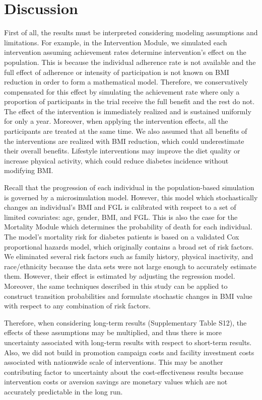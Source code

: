 \documentclass[fleqn,10pt]{wlscirep}
\begin{document}
\section*{Discussion}
First of all, the results must be interpreted considering modeling assumptions and limitations. For example, in the Intervention Module, we simulated each intervention assuming achievement rates determine intervention's effect on the population. This is because the individual adherence rate is not available and the full effect of adherence or intensity of participation is not known on BMI reduction in order to form a mathematical model. Therefore, we conservatively compensated for this effect by simulating the achievement rate where only a proportion of participants in the trial receive the full benefit and the rest do not. The effect of the intervention is immediately realized and is sustained uniformly for only a year. Moreover, when applying the intervention effects, all the participants are treated at the same time. We also assumed that all benefits of the interventions are realized with BMI reduction, which could underestimate their overall benefits. Lifestyle interventions may improve the diet quality or increase physical activity, which could reduce diabetes incidence without modifying BMI. 

Recall that the progression of each individual in the population-based simulation is governed by a microsimulation model. However, this model which stochastically changes an individual's BMI and FGL is calibrated with respect to a set of limited covariates: age, gender, BMI, and FGL. This is also the case for the Mortality Module which determines the probability of death for each individual. The model’s mortality risk for diabetes patients is based on a validated Cox proportional hazards model, which originally contains a broad set of risk factors. We eliminated several risk factors such as family history, physical inactivity, and race/ethnicity because the data sets were not large enough to accurately estimate them. However, their effect is estimated by adjusting the regression model. Moreover, the same techniques described in this study can be applied to construct transition probabilities and formulate stochastic changes in BMI value with respect to any combination of risk factors.

Therefore, when considering long-term results (Supplementary Table S12), the effects of these assumptions may be multiplied, and thus there is more uncertainty associated with long-term results with respect to short-term results. Also, we did not build in promotion campaign costs and facility investment costs associated with nationwide scale of interventions. This may be another contributing factor to uncertainty about the cost-effectiveness results because intervention costs or aversion savings are monetary values which are not accurately predictable in the long run. 
\end{document}
